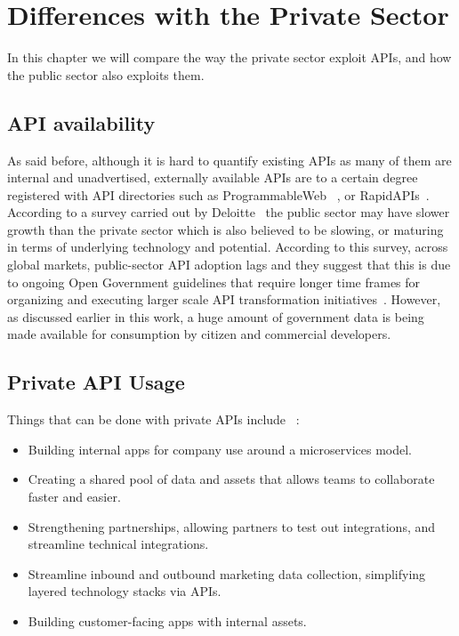 \chapter{Differences with the Private Sector}

\ifpdf
    \graphicspath{{Chapter3/Figs/Raster/}{Chapter3/Figs/PDF/}{Chapter3/Figs/}}
\else
    \graphicspath{{Chapter3/Figs/Vector/}{Chapter3/Figs/}}
\fi

In this chapter we will compare the way the
private sector exploit APIs, and how the public sector also exploits them.

\section{API availability}

As said before, although it is hard to quantify existing APIs
as many of them are internal and unadvertised, externally available
APIs are to a certain degree registered with API directories such as ProgrammableWeb
~\citep{programmableweb_apis}, or RapidAPIs~\citep{rapid_apis}. According to a survey carried out by Deloitte~\citep{deloitte_insights} the public sector may have slower growth than the private
sector which is also believed to be slowing, or maturing in terms of underlying technology and
potential. According to
this survey, across global markets, public-sector API adoption lags and they
suggest that this is due to ongoing Open Government guidelines that
require longer time frames for organizing and executing larger scale API
transformation initiatives~\citep{deloitte_insights}. However, as discussed earlier in this
work, a huge amount of government data is being made available for
consumption by citizen and commercial developers.

\section{Private API Usage}

 Things that can be done with private APIs include ~\citep{upwork}:

\begin{itemize}
	\item Building internal apps for company use around a microservices model.
	\item Creating a shared pool of data and assets that allows teams to collaborate faster and easier.
	\item Strengthening partnerships, allowing partners to test out integrations, and streamline technical integrations.
	\item Streamline inbound and outbound marketing data collection, simplifying layered technology stacks via APIs.
	\item Building customer-facing apps with internal assets.
\end{itemize}


